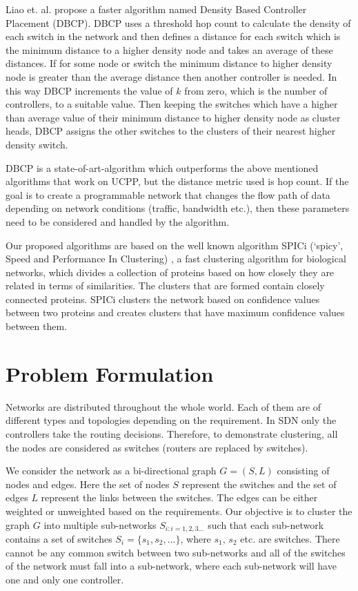 \documentclass[a4paper,twocolumn,preprint]{elsarticle}
\begin{document}
Liao et. al.\cite{dbcp2017} propose a faster algorithm named Density Based Controller Placement (DBCP). DBCP uses a threshold hop count to calculate the density of each switch in the network and then defines a distance for each switch which is the minimum distance to a higher density node and takes an average of these distances. If for some node or switch the minimum distance to higher density node is greater than the average distance then another controller is needed. In this way DBCP increments the value of $k$ from zero, which is the number of controllers, to a suitable value. Then keeping the switches which have a higher than average value of their minimum distance to higher density node as cluster heads, DBCP assigns the other switches to the clusters of their nearest higher density switch.

DBCP is a state-of-art-algorithm which outperforms the above mentioned algorithms that work on UCPP, but the distance metric used is hop count. If the goal is to create a programmable network that changes the flow path of data depending on network conditions (traffic, bandwidth etc.), then these parameters need to be considered and handled by the algorithm.

Our proposed algorithms are based on the well known algorithm SPICi (‘spicy’, Speed and Performance In Clustering) \cite{spici2010}, a fast clustering algorithm for biological networks, which divides a collection of proteins based on how closely they are related in terms of similarities\cite{protein2005palla}. The clusters that are formed contain closely connected proteins. SPICi clusters the network based on confidence values between two proteins and creates clusters that have maximum confidence values between them.

\section{Problem Formulation} \label{problemformulation}

Networks are distributed throughout the whole world. Each of them are of different types and topologies depending on the requirement. In SDN only the controllers take the routing decisions. Therefore, to demonstrate clustering, all the nodes are considered as switches (routers are replaced by switches).

We consider the network as a bi-directional graph $G=(S,L)$ consisting of nodes and edges. Here the set of nodes $S$ represent the switches and the set of edges $L$ represent the links between the switches. The edges can be either weighted or unweighted based on the requirements. Our objective is to cluster the graph $G$ into multiple sub-networks $S_{i:i=1,2,3...}$ such that each sub-network contains a set of switches $S_i=\{s_1,s_2,...\}$, where $s_1$, $s_2$ etc. are switches. There cannot be any common switch between two sub-networks and all of the switches of the network must fall into a sub-network, where each sub-network will have one and only one controller.
\end{document}
